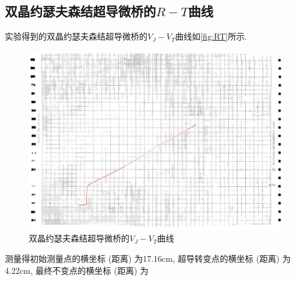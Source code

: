 \documentclass[font=default]{mpltx}
\newcommand{\note}[1]{{\color{gray}#1}}
\newcommand*\cs[1]{\texttt{\textbackslash #1}}
\newcommand*\env[1]{\textit{\texttt{#1}}}
\begin{document}
\subsection{双晶约瑟夫森结超导微桥的$R-T$曲线}
实验得到的双晶约瑟夫森结超导微桥的$V_J-V_T$曲线如\autoref{fig:RT}所示.
\begin{figure}
  \centering
  \includegraphics[width=0.85\linewidth]{fig/3.jpg}
  \caption{双晶约瑟夫森结超导微桥的$V_J-V_T$曲线}
  \label{fig:RT}
\end{figure}

测量得初始测量点的横坐标 (距离) 为17.16cm, 超导转变点的横坐标 (距离) 为4.22cm, 最终不变点的横坐标 (距离) 为





\end{document}

